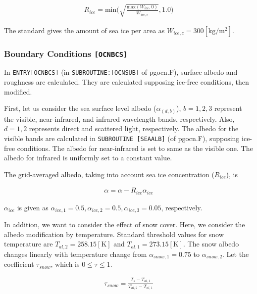\begin{eqnarray}
R_{ice} = \mathrm{min}\Big(\sqrt{\frac{\mathrm{max}(W_{ice},0)}{W_{ice,c}}},1.0\Big)
\end{eqnarray}

The standard gives the amount of sea ice per area as
\(W_{ice,c}=300 \mathrm{[kg/m^2]}\).

\hypertarget{boundary-conditions-ocnbcs}{%
\subsubsection{\texorpdfstring{Boundary Conditions
\texttt{{[}OCNBCS{]}}}{Boundary Conditions {[}OCNBCS{]}}}\label{boundary-conditions-ocnbcs}}

In \texttt{ENTRY{[}OCNBCS{]}} (in \texttt{SUBROUTINE:{[}OCNSUB{]}} of
pgocn.F), surface albedo and roughness are calculated. They are
calculated supposing ice-free conditions, then modified.

First, let us consider the sea surface level albedo
(\(\alpha_{(d,b)}\)), \(b=1,2,3\) represent the visible, near-infrared,
and infrared wavelength bands, respectively. Also, \(d=1,2\) represents
direct and scattered light, respectively. The albedo for the visible
bands are calculated in \texttt{SUBROUTINE\ {[}SEAALB{]}} (of pgocn.F),
supposing ice-free conditions. The albedo for near-infrared is set to
same as the visible one. The albedo for infrared is uniformly set to a
constant value.

The grid-averaged albedo, taking into account sea ice concentration
(\(R_{ice}\)), is

\begin{eqnarray}
    \alpha = \alpha -R_{ice} \alpha_{ice}
\end{eqnarray}

\(\alpha_{ice}\) is given as
\(\alpha_{ice,1}=0.5,\alpha_{ice,2}=0.5,\alpha_{ice,3}=0.05\),
respectively.

In addition, we want to consider the effect of snow cover. Here, we
consider the albedo modification by temperature. Standard threshold
values for snow temperature are \(T_{al,2}=258.15 \mathrm{[K]}\) and
\(T_{al,1}=273.15 \mathrm{[K]}\). The snow albedo changes linearly with
temperature change from \(\alpha_{snow,1}=0.75\) to
\(\alpha_{ snow,2}\). Let the coefficient \(\tau_{snow}\), which is
\(0\le \tau \le 1\).

\begin{eqnarray}
\tau_{snow} = \frac{T_s - T_{al,1}}{T_{al,2}-T_{al,1}}
\end{eqnarray}

